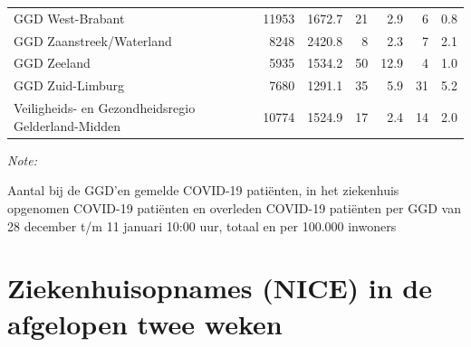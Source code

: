 \documentclass[
  english,
  man,floatsintext]{apa6}
\begin{document}
\begin{table}
\begin{threeparttable}
\begin{tabular}{lrrrrrr}
GGD West-Brabant & 11953 & 1672.7 & 21 & 2.9 & 6 & 0.8\\
GGD Zaanstreek/Waterland & 8248 & 2420.8 & 8 & 2.3 & 7 & 2.1\\
GGD Zeeland & 5935 & 1534.2 & 50 & 12.9 & 4 & 1.0\\
GGD Zuid-Limburg & 7680 & 1291.1 & 35 & 5.9 & 31 & 5.2\\
Veiligheids- en Gezondheidsregio Gelderland-Midden & 10774 & 1524.9 & 17 & 2.4 & 14 & 2.0\\
\bottomrule
\end{tabular}
\begin{tablenotes}
\item \textit{Note: } 
\item Aantal bij de GGD’en gemelde COVID-19 patiënten, in het ziekenhuis opgenomen COVID-19 patiënten en overleden COVID-19 patiënten per GGD van 28 december t/m 11 januari 10:00 uur, totaal en per 100.000 inwoners
\end{tablenotes}
\end{threeparttable}
\endgroup{}
\end{table}

\newpage

\hypertarget{ziekenhuisopnames-nice-in-de-afgelopen-twee-weken}{%
\section{Ziekenhuisopnames (NICE) in de afgelopen twee weken}\label{ziekenhuisopnames-nice-in-de-afgelopen-twee-weken}}
\end{document}
